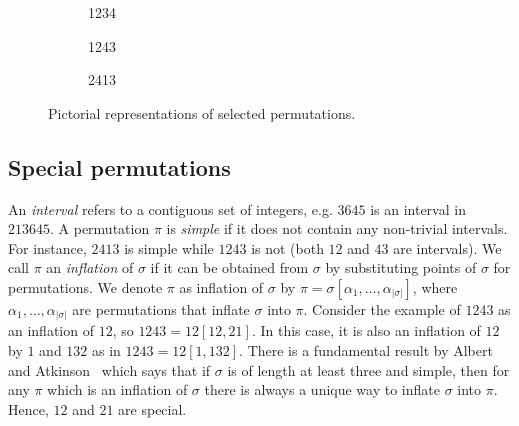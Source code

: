 \documentclass[12pt, a4paper, twoside]{report}
\begin{document}
\begin{figure}[ht]
  \begin{center}
    \begin{subfigure}[b]{0.3\textwidth}
      \centering
      \caption{1234}
    \end{subfigure}
    \begin{subfigure}[b]{0.3\textwidth}
      \centering
      \caption{1243}
    \end{subfigure}
    \begin{subfigure}[b]{0.3\textwidth}
      \centering
      \caption{2413}
    \end{subfigure}

  \end{center}
  \caption{Pictorial representations of selected permutations.}
  \label{fig:im2413}
\end{figure}
    
\subsection{Special permutations}

An \emph{interval} refers to a contiguous set of integers, e.g. $3645$ is an interval in $213645$. A permutation $\pi$ is \emph{simple} if it does not contain any non-trivial intervals. For instance, $2413$ is simple while $1243$ is not (both $12$ and $43$ are intervals). We call $\pi$ an \emph{inflation} of $\sigma$ if it can be obtained from $\sigma$ by substituting points of $\sigma$ for permutations. We denote $\pi$ as inflation of $\sigma$ by $\pi = \sigma[\alpha_1,\ldots,\alpha_{|\sigma|}]$, where $\alpha_1,\ldots,\alpha_{|\sigma|}$ are permutations that inflate $\sigma$ into $\pi$. Consider the example of $1243$ as an inflation of $12$, so $1243 = 12[12,21]$. In this case, it is also an inflation of $12$ by $1$ and $132$ as in $1243=12[1,132]$. There is a fundamental result by Albert and Atkinson~\cite{albertatkinsonrestricted} which says that if $\sigma$ is of length at least three and simple, then for any $\pi$ which is an inflation of $\sigma$ there is always a unique way to inflate $\sigma$ into $\pi$. Hence, $12$ and $21$ are special. 
\end{document}

